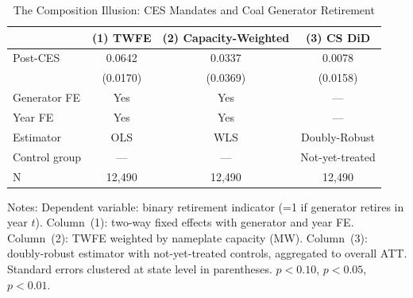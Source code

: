 \begin{table}[t]
\centering
\caption{The Composition Illusion: CES Mandates and Coal Generator Retirement}
\label{tab:main}
\begin{tabular}{lccc}
\hline\hline
 & (1) TWFE & (2) Capacity-Weighted & (3) CS DiD \\
\hline
Post-CES & 0.0642\sym{***} & 0.0337 & 0.0078 \\
 & (0.0170) & (0.0369) & (0.0158) \\
[6pt]
Generator FE & Yes & Yes & --- \\
Year FE & Yes & Yes & --- \\
Estimator & OLS & WLS & Doubly-Robust \\
Control group & --- & --- & Not-yet-treated \\
N & 12,490 & 12,490 & 12,490 \\
\hline\hline
\end{tabular}
\begin{flushleft}\small Notes: Dependent variable: binary retirement indicator (=1 if generator retires in year $t$). Column~(1): two-way fixed effects with generator and year FE. Column~(2): TWFE weighted by nameplate capacity (MW). Column~(3): \citet{CallawayS2021} doubly-robust estimator with not-yet-treated controls, aggregated to overall ATT. Standard errors clustered at state level in parentheses. \sym{*} $p<0.10$, \sym{**} $p<0.05$, \sym{***} $p<0.01$.\end{flushleft}
\end{table}
